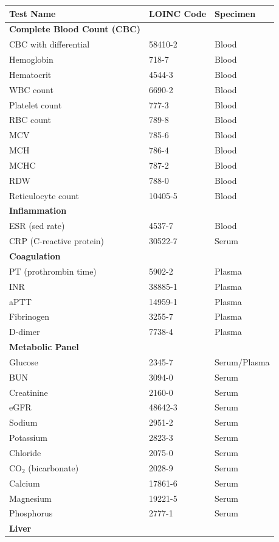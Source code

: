 \begin{longtable}{@{}p{5.5cm}p{2.5cm}p{2.2cm}@{}}
\toprule
\textbf{Test Name} & \textbf{LOINC Code} & \textbf{Specimen} \\
\midrule
\endhead
\textbf{Complete Blood Count (CBC)} & & \\
CBC with differential & 58410-2 & Blood \\
Hemoglobin & 718-7 & Blood \\
Hematocrit & 4544-3 & Blood \\
WBC count & 6690-2 & Blood \\
Platelet count & 777-3 & Blood \\
RBC count & 789-8 & Blood \\
MCV & 785-6 & Blood \\
MCH & 786-4 & Blood \\
MCHC & 787-2 & Blood \\
RDW & 788-0 & Blood \\
Reticulocyte count & 10405-5 & Blood \\
\textbf{Inflammation} & & \\
ESR (sed rate) & 4537-7 & Blood \\
CRP (C-reactive protein) & 30522-7 & Serum \\
\textbf{Coagulation} & & \\
PT (prothrombin time) & 5902-2 & Plasma \\
INR & 38885-1 & Plasma \\
aPTT & 14959-1 & Plasma \\
Fibrinogen & 3255-7 & Plasma \\
D-dimer & 7738-4 & Plasma \\
\textbf{Metabolic Panel} & & \\
Glucose & 2345-7 & Serum/Plasma \\
BUN & 3094-0 & Serum \\
Creatinine & 2160-0 & Serum \\
eGFR & 48642-3 & Serum \\
Sodium & 2951-2 & Serum \\
Potassium & 2823-3 & Serum \\
Chloride & 2075-0 & Serum \\
CO$_2$ (bicarbonate) & 2028-9 & Serum \\
Calcium & 17861-6 & Serum \\
Magnesium & 19221-5 & Serum \\
Phosphorus & 2777-1 & Serum \\
\textbf{Liver} & & \\

\end{longtable}
